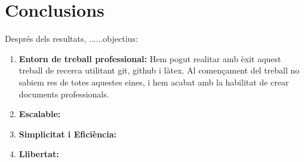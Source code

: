\chapter{Conclusions}
\label{c:conclusions}
Després dels resultats, ......objectius:
\begin{enumerate}
     \item \textbf{Entorn de treball professional:} Hem pogut realitar amb èxit aquest treball de recerca utilitant git, github i làtex. Al començament del treball no sabiem res de totes aquestes eines, i hem acabat amb la habilitat de crear documents professionals.
     \item \textbf{Escalable:}
     \item \textbf{Simplicitat i Eficiència:}
     \item \textbf{Llibertat:}
\end{enumerate}


